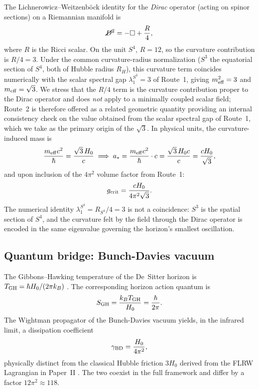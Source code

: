 \documentclass[11pt,a4paper]{article}
\newcommand{\slashed}[1]{\cancel{#1}}
\begin{document}
The Lichnerowicz--Weitzenb\"ock identity for the \emph{Dirac} operator (acting on spinor
sections) on a Riemannian manifold is
\begin{equation}
  \slashed{D}^2 = -\Box + \frac{R}{4},
\end{equation}
where $R$ is the Ricci scalar. On the unit $S^4$, $R = 12$, so the curvature
contribution is $R/4 = 3$. Under the common curvature-radius normalization ($S^3$ the
equatorial section of $S^4$, both of Hubble radius $R_H$), this curvature term coincides
numerically with the scalar spectral gap $\lambda_1^{S^3} = 3$ of Route~1, giving
$m_{\rm eff}^2 = 3$ and $m_{\rm eff} = \sqrt{3}$. We stress that the $R/4$ term is the
curvature contribution proper to the Dirac operator and does \emph{not} apply to a
minimally coupled scalar field; Route~2 is therefore offered as a related geometric
quantity providing an internal consistency check on the value obtained from the scalar
spectral gap of Route~1, which we take as the primary origin of the $\sqrt{3}$.
In physical units, the curvature-induced mass is
\begin{equation}
  \frac{m_{\rm eff}c^2}{\hbar} = \frac{\sqrt{3}\,H_0}{c}
  \implies
  a_* = \frac{m_{\rm eff}c^2}{\hbar}\cdot c = \frac{\sqrt{3}\,H_0 c}{c}
  = \frac{cH_0}{\sqrt{3}},
\end{equation}
and upon inclusion of the $4\pi^2$ volume factor from Route~1:
\begin{equation}
  g_{\rm crit} = \frac{cH_0}{4\pi^2\sqrt{3}}.
\end{equation}
The numerical identity $\lambda_1^{S^3} = R_{S^4}/4 = 3$ is not a coincidence: $S^3$
is the spatial section of $S^4$, and the curvature felt by the field through the Dirac
operator is encoded in the same eigenvalue governing the horizon's smallest oscillation.

\subsection{Quantum bridge: Bunch-Davies vacuum}
\label{subsec:BD}

The Gibbons--Hawking temperature of the De~Sitter horizon is $T_{\rm GH} = \hbar H_0/(2\pi k_B)$
\cite{Gibbons1977}. The corresponding horizon action quantum is
\begin{equation}
  S_{\rm GH} = \frac{k_B T_{\rm GH}}{H_0} = \frac{\hbar}{2\pi}.
\end{equation}
The Wightman propagator of the Bunch-Davies vacuum \cite{Bunch1978} yields, in the
infrared limit, a dissipation coefficient
\begin{equation}
  \gamma_{\rm BD} = \frac{H_0}{4\pi^2},
\end{equation}
physically distinct from the classical Hubble friction $3H_0$ derived from the FLRW
Lagrangian in Paper~II \cite{PaperII}. The two coexist in the full framework and
differ by a factor $12\pi^2 \approx 118$.
\end{document}
